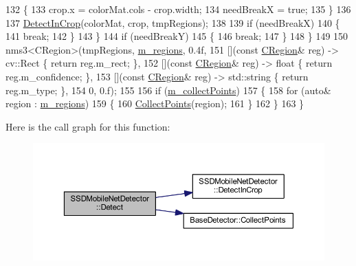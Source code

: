 \begin{DoxyCode}
132             \{
133                 crop.x = colorMat.cols - crop.width;
134                 needBreakX = \textcolor{keyword}{true};
135             \}
136 
137             \mbox{\hyperlink{class_s_s_d_mobile_net_detector_a9c0fe7a122d0b229d84965f472cc6c38}{DetectInCrop}}(colorMat, crop, tmpRegions);
138 
139             \textcolor{keywordflow}{if} (needBreakX)
140             \{
141                 \textcolor{keywordflow}{break};
142             \}
143         \}
144         \textcolor{keywordflow}{if} (needBreakY)
145         \{
146             \textcolor{keywordflow}{break};
147         \}
148     \}
149 
150     nms3<CRegion>(tmpRegions, \mbox{\hyperlink{class_base_detector_a409c20093acba261db8354ca72058fce}{m\_regions}}, 0.4f,
151          [](\textcolor{keyword}{const} \mbox{\hyperlink{class_c_region}{CRegion}}& reg) -> cv::Rect \{ \textcolor{keywordflow}{return} reg.m\_rect; \},
152     [](\textcolor{keyword}{const} \mbox{\hyperlink{class_c_region}{CRegion}}& reg) -> \textcolor{keywordtype}{float} \{ \textcolor{keywordflow}{return} reg.m\_confidence; \},
153     [](\textcolor{keyword}{const} \mbox{\hyperlink{class_c_region}{CRegion}}& reg) -> std::string \{ \textcolor{keywordflow}{return} reg.m\_type; \},
154     0, 0.f);
155 
156     \textcolor{keywordflow}{if} (\mbox{\hyperlink{class_base_detector_a403cbf784fcb960bdb7d080c86c4a2ea}{m\_collectPoints}})
157     \{
158         \textcolor{keywordflow}{for} (\textcolor{keyword}{auto}& region : \mbox{\hyperlink{class_base_detector_a409c20093acba261db8354ca72058fce}{m\_regions}})
159         \{
160             \mbox{\hyperlink{class_base_detector_a20380b0980c6f262b0829f37fb89d2a7}{CollectPoints}}(region);
161         \}
162     \}
163 \}
\end{DoxyCode}
Here is the call graph for this function\+:\nopagebreak
\begin{figure}[H]
\begin{center}
\leavevmode
\includegraphics[width=350pt]{class_s_s_d_mobile_net_detector_a6ac3fd479002779642ed185107d83dea_cgraph}
\end{center}
\end{figure}
\mbox{\label{class_s_s_d_mobile_net_detector_a9c0fe7a122d0b229d84965f472cc6c38}} 
